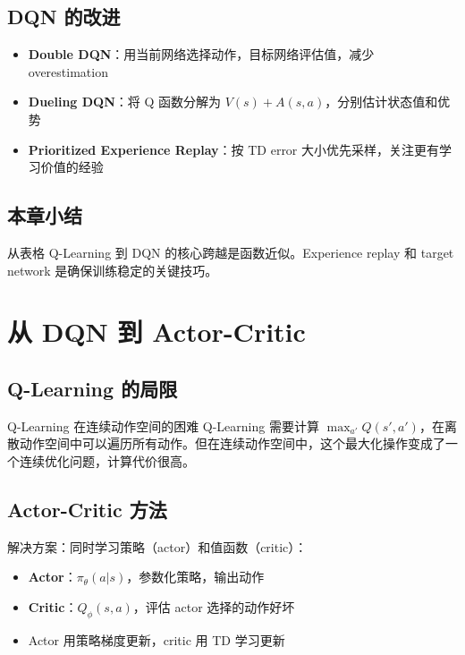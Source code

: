 \documentclass[a4paper]{article}
\begin{document}
\subsection{DQN 的改进}

\begin{itemize}
    \item \textbf{Double DQN}：用当前网络选择动作，目标网络评估值，减少 overestimation
    \item \textbf{Dueling DQN}：将 Q 函数分解为 $V(s) + A(s, a)$，分别估计状态值和优势
    \item \textbf{Prioritized Experience Replay}：按 TD error 大小优先采样，关注更有学习价值的经验
\end{itemize}

\subsection{本章小结}

从表格 Q-Learning 到 DQN 的核心跨越是函数近似。Experience replay 和 target network 是确保训练稳定的关键技巧。

\section{从 DQN 到 Actor-Critic}

\subsection{Q-Learning 的局限}

\begin{warningbox}{Q-Learning 在连续动作空间的困难}
Q-Learning 需要计算 $\max_{a'} Q(s', a')$，在离散动作空间中可以遍历所有动作。但在连续动作空间中，这个最大化操作变成了一个连续优化问题，计算代价很高。
\end{warningbox}

\subsection{Actor-Critic 方法}

解决方案：同时学习策略（actor）和值函数（critic）：
\begin{itemize}
    \item \textbf{Actor}：$\pi_\theta(a|s)$，参数化策略，输出动作
    \item \textbf{Critic}：$Q_\phi(s, a)$，评估 actor 选择的动作好坏
    \item Actor 用策略梯度更新，critic 用 TD 学习更新
\end{itemize}
\end{document}
